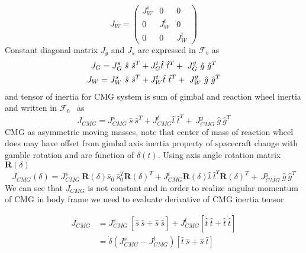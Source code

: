 \begin{equation}
J_{W} =\begin{pmatrix}
J^{s}_{W} & 0 & 0\\
0 & J^{t}_{W} & 0\\
0 & 0 & J^{t}_{W}
\end{pmatrix}
\end{equation}
Constant diagonal matrix $\displaystyle J_{g}$ and $\displaystyle J_{s}$ are expressed in $\displaystyle \mathcal{F}_{b}$ as
\begin{gather}
J_{G} =J^{s}_{G} \ \hat{s} \ \hat{s}^{T} +J^{t}_{G}\hat{t} \ \hat{t}^{T} +\ J^{g}_{G} \ \hat{g} \ \hat{g}^{T}\\
J_{W} =J^{s}_{W} \ \hat{s} \ \hat{s}^{T} +J^{t}_{W}\hat{t} \ \hat{t}^{T} +\ J^{g}_{W} \ \hat{g} \ \hat{g}^{T} \notag
\end{gather}
and tensor of inertia for CMG system is sum of gimbal and reaction wheel inertia and written in $\displaystyle \mathcal{F}_{b}$ \ as
\begin{equation}
J_{CMG} =J^{s}_{CMG} \ \hat{s} \ \hat{s}^{T} +J^{t}_{CMG}\hat{t} \ \hat{t}^{T} +\ J^{g}_{CMG} \ \hat{g} \ \hat{g}^{T}
\end{equation}
CMG as asymmetric moving masses, note that center of mass of reaction wheel does may have offset from gimbal axis inertia property of spacecraft change with gamble rotation and are function of $\displaystyle \delta ( t)$. Using axis angle rotation matrix $\displaystyle \mathbf{R}( \delta )$
\begin{equation}
J_{CMG}( \delta ) =J^{s}_{CMG} \ \mathbf{R}( \delta )\hat{s}_{0} \ \hat{s}^{T}_{0}\mathbf{R}( \delta )^{T} +J^{t}_{CMG}\mathbf{R}( \delta )\hat{t} \ \hat{t}^{T}\mathbf{R}( \delta )^{T} +\ J^{g}_{CMG} \ \hat{g} \ \hat{g}^{T}
\end{equation}
We can see that $\displaystyle J_{CMG}$ is not constant and in order to realize angular momentum of CMG in body frame we need to evaluate derivative of CMG inertia tensor

\begin{equation}
\begin{aligned}
\dot{J}_{CMG} & =J^{s}_{CMG} \ \left[\dot{\hat{s}} \ \hat{s} +\hat{s} \ \dot{\hat{s}}\right] +J^{t}_{CMG}\left[\dot{\hat{t}} \ \hat{t} +\hat{t} \ \dot{\hat{t}}\right]\\
 & =\dot{\delta}\left( J^{s}_{CMG} -J^{t}_{CMG}\right)[\hat{t} \ \hat{s} +\hat{s} \ \hat{t}]
\end{aligned}
\label{eqn:Jcmg_dot}
\end{equation}

